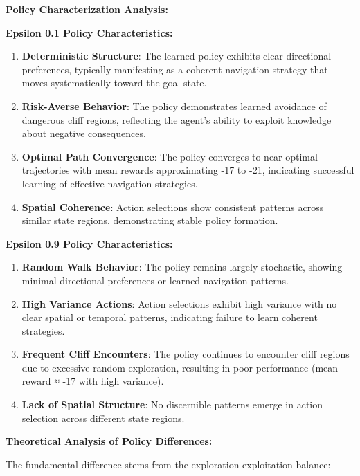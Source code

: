 \documentclass[12pt]{article}
\begin{document}
{{{\textbf{Policy Characterization Analysis:}

\textbf{Epsilon 0.1 Policy Characteristics:}
\begin{enumerate}
    \item \textbf{Deterministic Structure}: The learned policy exhibits clear directional preferences, typically manifesting as a coherent navigation strategy that moves systematically toward the goal state.
    
    \item \textbf{Risk-Averse Behavior}: The policy demonstrates learned avoidance of dangerous cliff regions, reflecting the agent's ability to exploit knowledge about negative consequences.
    
    \item \textbf{Optimal Path Convergence}: The policy converges to near-optimal trajectories with mean rewards approximating -17 to -21, indicating successful learning of effective navigation strategies.
    
    \item \textbf{Spatial Coherence}: Action selections show consistent patterns across similar state regions, demonstrating stable policy formation.
\end{enumerate}

\textbf{Epsilon 0.9 Policy Characteristics:}
\begin{enumerate}
    \item \textbf{Random Walk Behavior}: The policy remains largely stochastic, showing minimal directional preferences or learned navigation patterns.
    
    \item \textbf{High Variance Actions}: Action selections exhibit high variance with no clear spatial or temporal patterns, indicating failure to learn coherent strategies.
    
    \item \textbf{Frequent Cliff Encounters}: The policy continues to encounter cliff regions due to excessive random exploration, resulting in poor performance (mean reward ≈ -17 with high variance).
    
    \item \textbf{Lack of Spatial Structure}: No discernible patterns emerge in action selection across different state regions.
\end{enumerate}

\textbf{Theoretical Analysis of Policy Differences:}

The fundamental difference stems from the exploration-exploitation balance:

}}}
\end{document}
